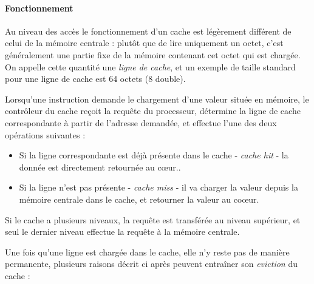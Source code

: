 \paragraph{Fonctionnement}

Au niveau des accès le fonctionnement d'un cache est légèrement différent de celui de la mémoire centrale : plutôt que de lire uniquement un octet, c'est généralement une partie fixe de la mémoire contenant cet octet qui est chargée.
On appelle cette quantité une \emph{ligne de cache}, et un exemple de taille standard pour une ligne de cache est 64 octets (8 double).

Lorsqu'une instruction demande le chargement d'une valeur située en mémoire, le contrôleur du cache reçoit la requête du processeur, détermine la ligne de cache correspondante à partir de l'adresse demandée, et effectue l'une des deux opérations suivantes :
\begin{itemize}
    \item Si la ligne correspondante est déjà présente dans le cache - \emph{cache hit} - la donnée est directement retournée au cœur..
    \item Si la ligne n'est pas présente - \emph{cache miss} - il va charger la valeur depuis la mémoire centrale dans le cache, et retourner la valeur au coœur.
\end{itemize}

Si le cache a plusieurs niveaux, la requête est transférée au niveau supérieur, et seul le dernier niveau effectue la requête à la mémoire centrale.

Une fois qu'une ligne est chargée dans le cache, elle n'y reste pas de manière permanente, plusieurs raisons décrit ci après peuvent entraîner son \emph{eviction} du cache :

